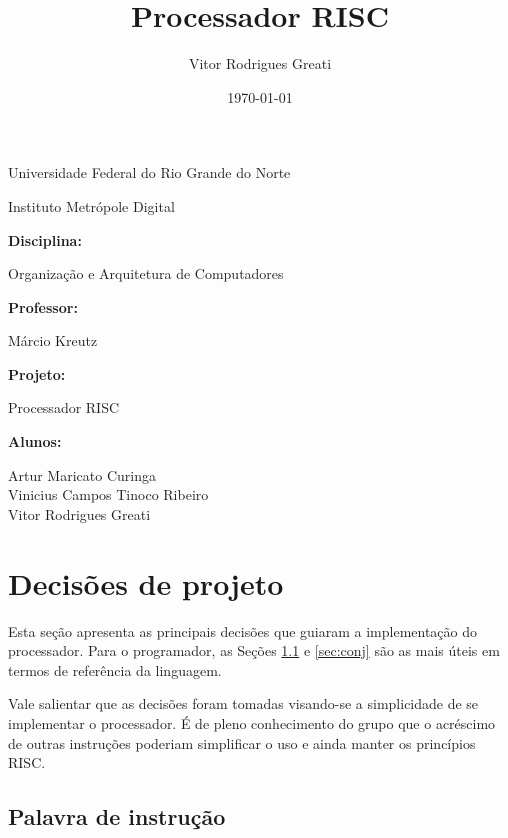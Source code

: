 \documentclass[a4paper]{article}
\title{Processador RISC}
\author{Vitor Rodrigues Greati}
\date{\today}
\begin{document}
\begin{center}

{\large Universidade Federal do Rio Grande do Norte

Instituto Metrópole Digital}

\vspace{5mm}

\textbf{Disciplina:}

Organização e Arquitetura de Computadores

\vspace{5mm}

\textbf{Professor:}

Márcio Kreutz

\vspace{5mm}

\textbf{Projeto:}
\vspace{2mm}

{\Huge Processador RISC}

\vspace{5mm}

\textbf{Alunos:}

Artur Maricato Curinga\\Vinicius Campos Tinoco Ribeiro\\Vitor Rodrigues Greati

\end{center}

\vspace{5mm}

\tableofcontents

\newpage

\section{Decisões de projeto}

Esta seção apresenta as principais decisões que guiaram a implementação
do processador. Para o programador, as Seções \ref{sec:word} e \ref{sec:conj}
são as mais úteis em termos de referência da linguagem.

Vale salientar que as decisões foram tomadas visando-se a simplicidade de se
implementar o processador. É de pleno conhecimento do grupo que o acréscimo
de outras instruções poderiam simplificar o uso e ainda manter os princípios
RISC. 

\subsection{Palavra de instrução}
\label{sec:word}
\end{document}
